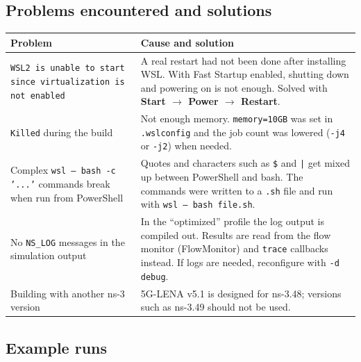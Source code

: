 \documentclass[10.5pt,a4paper]{article}
\begin{document}
\subsection{Problems encountered and solutions}
\begingroup\sffamily\small
\begin{xltabular}{\textwidth}{@{}p{4.3cm}X@{}}
\toprule
\textbf{Problem} & \textbf{Cause and solution} \\
\midrule
\texttt{WSL2 is unable to start since virtualization is not enabled} & A real restart had not been done after installing WSL. With Fast Startup enabled, shutting down and powering on is not enough. Solved with \textbf{Start $\rightarrow$ Power $\rightarrow$ Restart}. \\
\texttt{Killed} during the build & Not enough memory. \texttt{memory=10GB} was set in \texttt{.wslconfig} and the job count was lowered (\texttt{-j4} or \texttt{-j2}) when needed. \\
Complex \texttt{wsl -- bash -c '...'} commands break when run from PowerShell & Quotes and characters such as \texttt{\$} and \texttt{|} get mixed up between PowerShell and bash. The commands were written to a \texttt{.sh} file and run with \texttt{wsl -- bash file.sh}. \\
No \texttt{NS\_LOG} messages in the simulation output & In the ``optimized'' profile the log output is compiled out. Results are read from the flow monitor (FlowMonitor) and \texttt{trace} callbacks instead. If logs are needed, reconfigure with \texttt{-d debug}. \\
Building with another ns-3 version & 5G-LENA v5.1 is designed for ns-3.48; versions such as ns-3.49 should not be used. \\
\bottomrule
\end{xltabular}
\endgroup

\subsection{Example runs}
\end{document}
